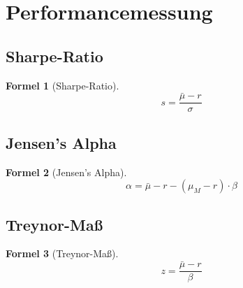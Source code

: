 \documentclass[a4paper]{article}
\theoremstyle{break}
\newtheorem{formula}{Formel}[section]
\begin{document}
    \section{Performancemessung}
    \subsection{Sharpe-Ratio}
    \begin{formula}[Sharpe-Ratio]
        $$s = \frac{\bar{\mu} - r}{\sigma}$$
    \end{formula}
    \subsection{Jensen's Alpha}
    \begin{formula}[Jensen's Alpha]
        $$\alpha = \bar{\mu} - r - (\mu_M - r)  \cdot \beta$$
    \end{formula}
    \subsection{Treynor-Maß}
    \begin{formula}[Treynor-Maß]
        $$z = \frac{\bar{\mu} - r}{\beta}$$
    \end{formula}
\end{document}
